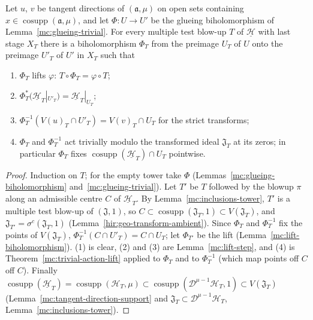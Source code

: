 \begin{theorem}
\label{mc:glueing-lift}
\leanok
Let \(u\), \(v\) be tangent directions of \((\mathfrak a,\mu)\) on open sets containing \(x\in\operatorname{cosupp}(\mathfrak a,\mu)\), and let
\(\Phi\colon U\to U'\) be the glueing biholomorphism of Lemma~\ref{mc:glueing-trivial}. For every multiple test blow-up \(T\) of \(\underline{\mathcal H}\)
with last stage \(X_T\) there is a biholomorphism \(\Phi_T\) from the preimage \(U_T\) of \(U\) onto the preimage \(U'_T\) of \(U'\) in \(X_T\) such that
\begin{enumerate}
\item \(\Phi_T\) lifts \(\varphi\): \(T\circ\Phi_T=\varphi\circ T\);
\item \(\Phi_T^*(\underline{\mathcal H}_T|_{U'_T})=\underline{\mathcal H}_T|_{U_T}\);
\item \(\Phi_T^{-1}(V(u)_T\cap U'_T)=V(v)_T\cap U_T\) for the strict transforms;
\item \(\Phi_T\) and \(\Phi_T^{-1}\) act trivially modulo the transformed ideal \(\mathfrak J_T\) at its zeros; in particular \(\Phi_T\) fixes
\(\operatorname{cosupp}(\underline{\mathcal H}_T)\cap U_T\) pointwise.
\end{enumerate}
\end{theorem}
\begin{proof}
\leanok
Induction on \(T\); for the empty tower take \(\Phi\) (Lemmas~\ref{mc:glueing-biholomorphism} and~\ref{mc:glueing-trivial}). Let \(T'\) be \(T\) followed by
the blowup \(\pi\) along an admissible centre \(C\) of \(\underline{\mathcal H}_T\). By Lemma~\ref{mc:inclusions-tower}, \(T'\) is a multiple test
blow-up of \((\mathfrak J,1)\), so \(C\subset\operatorname{cosupp}(\mathfrak J_T,1)\subset V(\mathfrak J_T)\), and \(\mathfrak J_{T'}=\sigma^c(\mathfrak J_T,1)\)
(Lemma~\ref{hir:geo-transform-ambient}). Since \(\Phi_T\) and \(\Phi_T^{-1}\) fix the points of \(V(\mathfrak J_T)\), \(\Phi_T^{-1}(C\cap U'_T)=C\cap U_T\);
let \(\Phi_{T'}\) be the lift (Lemma~\ref{mc:lift-biholomorphism}). (1) is clear, (2) and (3) are Lemma~\ref{mc:lift-step}, and (4) is
Theorem~\ref{mc:trivial-action-lift} applied to \(\Phi_T\) and to \(\Phi_T^{-1}\) (which map points off \(C\) off \(C\)). Finally
\(\operatorname{cosupp}(\underline{\mathcal H}_T)=\operatorname{cosupp}(\mathcal H_T,\mu)\subset\operatorname{cosupp}(\mathcal D^{\mu-1}\mathcal H_T,1)\subset V(\mathfrak J_T)\)
(Lemma~\ref{mc:tangent-direction-support} and \(\mathfrak J_T\subset\mathcal D^{\mu-1}\mathcal H_T\), Lemma~\ref{mc:inclusions-tower}).
\end{proof}
